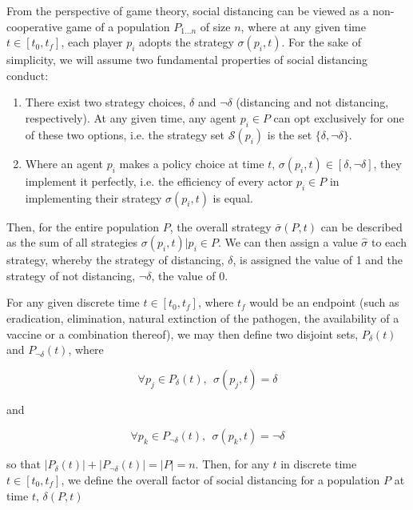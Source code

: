 \documentclass{article}
\begin{document}
From the perspective of game theory, social distancing can be viewed as a non-cooperative game of a population $P_{1 \ldots n}$ of size $n$, where at any given time $t \in [t_0, t_f]$, each player $p_i$ adopts the strategy $\sigma(p_i, t)$. For the sake of simplicity, we will assume two fundamental properties of social distancing conduct:

\begin{enumerate}
	\item There exist two strategy choices, $\delta$ and $\lnot \delta$ (distancing and not distancing, respectively). At any given time, any agent $p_i \in P$ can opt exclusively for one of these two options, i.e. the strategy set $\mathcal{S}(p_i)$ is the set $\{\delta, \lnot \delta\}$.
	\item Where an agent $p_i$ makes a policy choice at time $t$, $\sigma(p_i, t) \in [\delta, \lnot \delta]$, they implement it perfectly, i.e. the efficiency of every actor $p_i \in P$ in implementing their strategy $\sigma(p_i, t)$ is equal.
\end{enumerate}

Then, for the entire population $P$, the overall strategy $\bar{\sigma}(P, t)$ can be described as the sum of all strategies $\sigma(p_i, t) | p_i \in P$. We can then assign a value $\hat{\sigma}$ to each strategy, whereby the strategy of distancing, $\delta$, is assigned the value of 1 and the strategy of not distancing, $\lnot \delta$, the value of 0. 

For any given discrete time $t \in [t_0, t_f]$, where $t_f$ would be an endpoint (such as eradication, elimination, natural extinction of the pathogen, the availability of a vaccine or a combination thereof), we may then define two disjoint sets, $P_{\delta}(t)$ and $P_{\lnot \delta} (t)$, where 

\begin{equation}
	\forall p_j \in P_{\delta}(t), \ \ \sigma(p_j, t) = \delta
\end{equation}

\noindent and 

\begin{equation}
	\forall p_k \in P_{\lnot \delta}(t), \ \ \sigma(p_k, t) = \lnot \delta
\end{equation}

\noindent so that $|P_{\delta}(t)| + |P_{\lnot \delta}(t)| = |P| = n$. Then, for any $t$ in discrete time $t \in [t_0, t_f]$, we define the overall factor of social distancing for a population $P$ at time $t$, $\delta(P, t)$
\end{document}
